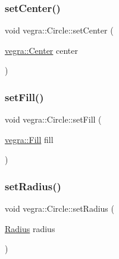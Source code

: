 \mbox{\label{structvegra_1_1Circle_a25017785ce433a356b6b15b5d2d36060}} 
\subsubsection{\texorpdfstring{set\+Center()}{setCenter()}}
{\footnotesize\ttfamily void vegra\+::\+Circle\+::set\+Center (\begin{DoxyParamCaption}\item[{\mbox{\hyperlink{structvegra_1_1Center}{vegra\+::\+Center}}}]{center }\end{DoxyParamCaption})\hspace{0.3cm}{\ttfamily [inline]}}

\mbox{\label{structvegra_1_1Circle_a3a5d0f5879eb8ecba92782670dc386b4}} 
\subsubsection{\texorpdfstring{set\+Fill()}{setFill()}}
{\footnotesize\ttfamily void vegra\+::\+Circle\+::set\+Fill (\begin{DoxyParamCaption}\item[{\mbox{\hyperlink{structvegra_1_1Fill}{vegra\+::\+Fill}}}]{fill }\end{DoxyParamCaption})\hspace{0.3cm}{\ttfamily [inline]}}

\mbox{\label{structvegra_1_1Circle_ac6f88039c6d3f666a8156876455854d0}} 
\subsubsection{\texorpdfstring{set\+Radius()}{setRadius()}}
{\footnotesize\ttfamily void vegra\+::\+Circle\+::set\+Radius (\begin{DoxyParamCaption}\item[{\mbox{\hyperlink{structvegra_1_1Radius}{Radius}}}]{radius }\end{DoxyParamCaption})\hspace{0.3cm}{\ttfamily [inline]}}

